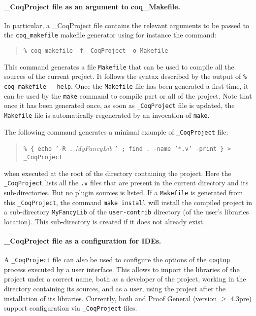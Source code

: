 \paragraph{\_CoqProject file as an argument to  coq\_Makefile.}
In particular, a \_CoqProject file contains the relevant
arguments to be passed to the \texttt{coq\_makefile} makefile
generator using for instance the command:

\begin{quotation}
\texttt{\% coq\_makefile -f \_CoqProject -o Makefile}
\end{quotation}

This command generates a file \texttt{Makefile} that can be used to
compile all the sources of the current project. It follows the
syntax described by the output of \texttt{\% coq\_makefile ----help}.
Once the \texttt{Makefile} file has been generated a first time, it
can be used by the \texttt{make} command to compile part or all of
the project. Note that once it has been generated once, as soon as
\texttt{\_CoqProject} file is updated, the \texttt{Makefile} file is
automatically regenerated by an invocation of \texttt{make}.

The following command generates a minimal example of
\texttt{\_CoqProject} file:
\begin{quotation}
\texttt{\% \{ echo '-R .} \textit{MyFancyLib} \texttt{' ; find . -name
  '*.v' -print \} > \_CoqProject}
\end{quotation}
when executed at the root of the directory containing the
project. Here the \texttt{\_CoqProject} lists all the \texttt{.v} files
that are present in the current directory and its sub-directories. But no
plugin sources is listed. If a \texttt{Makefile} is generated from
this \texttt{\_CoqProject}, the command \texttt{make install} will
install the compiled project in a sub-directory \texttt{MyFancyLib} of
the \texttt{user-contrib} directory  (of the user's {\Coq} libraries
location). This sub-directory is created if it does not already exist.

\paragraph{\_CoqProject file as a configuration for IDEs.}

A \texttt{\_CoqProject} file can also be used to configure the options
of the \texttt{coqtop} process executed by a user interface. This
allows to import the libraries of the project under a correct name,
both as a developer of the project, working in the directory
containing its sources, and as a user, using the project after
the installation of its libraries. Currently, both \CoqIDE{} and Proof
General (version $\geq$ 4.3pre) support configuration via
\texttt{\_CoqProject} files.

